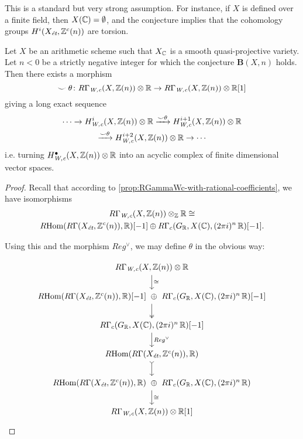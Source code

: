 \begin{remark}
  This is a standard but very strong assumption. For instance, if $X$ is defined
  over a finite field, then $X (\mathbb{C}) = \emptyset$, and the conjecture implies
  that the cohomology groups $H^i (X_\text{\it ét}, \mathbb{Z}^c (n))$ are torsion.
\end{remark}

\begin{theorem}
  \label{thm:smile-theta}
  Let $X$ be an arithmetic scheme such that $X_{\mathbb{C}}$ is a smooth quasi-projective
  variety. Let $n < 0$ be a strictly negative integer for which the conjecture
  $\mathbf{B} (X,n)$ holds. Then there exists a morphism
  \[ \smile\theta\colon R\Gamma_\text{\it W,c} (X, \mathbb{Z} (n)) \otimes \mathbb{R} \to R\Gamma_\text{\it W,c} (X, \mathbb{Z} (n)) \otimes \mathbb{R} [1] \]
  giving a long exact sequence
  \begin{multline*}
    \cdots \to H_\text{\it W,c}^i (X, \mathbb{Z} (n)) \otimes \mathbb{R}
    \xrightarrow{\smile\theta}
    H_\text{\it W,c}^{i+1} (X, \mathbb{Z} (n)) \otimes \mathbb{R} \\
    \xrightarrow{\smile\theta}
    H_\text{\it W,c}^{i+2} (X, \mathbb{Z} (n)) \otimes \mathbb{R} \to \cdots
  \end{multline*}
  i.e. turning $H^\bullet_\text{\it W,c} (X, \mathbb{Z} (n))\otimes\mathbb{R}$ into an acyclic
  complex of finite dimensional vector spaces.

  \begin{proof} Recall that according to
    \ref{prop:RGammaWc-with-rational-coefficients}, we have isomorphisms
    \begin{multline}
      \label{eqn:RGammaWc-splitting}
      R\Gamma_\text{\it W,c} (X,\mathbb{Z} (n))\otimes_{\mathbb{Z}} \mathbb{R} \cong \\
      R\!\operatorname{Hom} (R\Gamma (X_\text{\it ét}, \mathbb{Z}^c (n)), \mathbb{R}) [-1]
      \oplus
      R\Gamma_c (G_{\mathbb{R}}, X (\mathbb{C}), (2\pi i)^n\,\mathbb{R}) [-1].
    \end{multline}

    Using this and the morphism $Reg^\vee$, we may define $\theta$ in the
    obvious way:

    \[ \begin{tikzcd}
        R\Gamma_\text{\it W,c} (X, \ZZ (n)) \otimes \RR \ar{d}{\isom} \\
        \RHom (R\Gamma (X_\text{\it ét}, \ZZ^c (n)), \RR) [-1] ~\oplus~ R\Gamma_c (G_\RR, X (\CC), (2\pi i)^n\,\RR) [-1] \ar[twoheadrightarrow]{d} \\
        R\Gamma_c (G_\RR, X (\CC), (2\pi i)^n\,\RR) [-1] \ar{d}{Reg^\vee}\\
        \RHom (R\Gamma (X_\text{\it ét}, \ZZ^c (n)), \RR) \ar[rightarrowtail]{d} \\
        \RHom (R\Gamma (X_\text{\it ét}, \ZZ^c (n)), \RR) ~\oplus~ R\Gamma_c (G_\RR, X (\CC), (2\pi i)^n\,\RR) \ar{d}{\isom} \\
        R\Gamma_\text{\it W,c} (X, \ZZ (n)) \otimes \RR [1]
      \end{tikzcd} \]


\end{proof}
\end{theorem}
